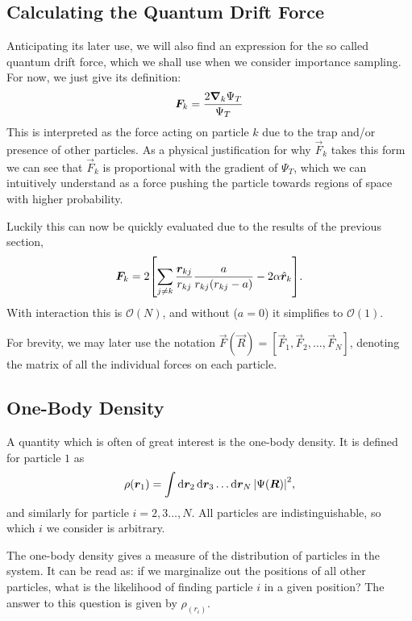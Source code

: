 \documentclass[a4paper, 11pt]{article}
\begin{document}
\begin{multicols}{2}
\subsection{Calculating the Quantum Drift Force}
Anticipating its later use, we will also find an expression for the so called
quantum drift force, which we shall use when we consider importance sampling.
For now, we just give its definition:
\begin{align}
    \bm F_k = \frac{2\grad_k\Psi_T}{\Psi_T}\label{eq:Q-force-def}
\end{align}
This is interpreted as the force acting on particle $k$ due to the trap and/or
presence of other particles. As a physical justification for why $\vec F_k$
takes this form we can see that $\vec F_k$ is
proportional with the gradient of $\Psi_T$, which we can intuitively understand
as a force pushing the particle towards regions of space with higher
probability. 

Luckily this can now be quickly evaluated due to
the results of the previous section,
\begin{align}
    \bm F_k = 2\qty[\sum_{j\neq k}\frac{\bm r_{kj}}{r_{kj}}
    \frac{a}{r_{kj}(r_{kj}-a)} - 2\alpha\hat{\bm
    r}_k].\label{eq:Q-force-explicit}
\end{align}
With interaction this is $\mathcal{O}(N)$, and without ($a=0$) it simplifies to $\mathcal{O}(1)$.

For brevity, we may later use the notation $\vec F(\vec R) = [\vec F_1, \vec
F_2,\dots,\vec F_N]$, denoting the matrix of all the individual forces on each
particle.

\subsection{One-Body Density}

A quantity which is often of great interest is the one-body density. It is defined for particle $1$ as
\begin{align}
    \rho(\bm r_1) = \int \dd{\bm r_2}\dd{\bm r_3}\dots\dd{\bm r_N} \abs{\Psi(\bm R)}^2\label{eq:one-body-def},
\end{align}
and similarly for particle $i = 2,3\dots, N$. All particles are indistinguishable, so which $i$ we consider is arbitrary.

The one-body density gives a measure of the distribution of particles in the
system. It can be read as: if we marginalize out the positions of all other
particles, what is the likelihood of finding particle $i$ in a given position?
The answer to this question is given by $\rho_(r_i)$.


\end{multicols}
\end{document}
